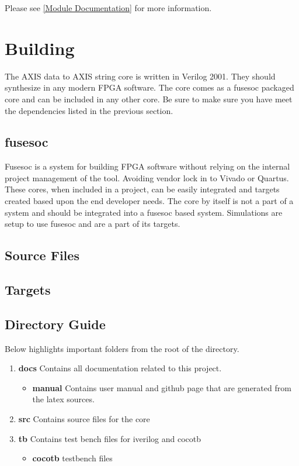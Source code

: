 Please see \ref{Module Documentation} for more information.

\section{Building}

\par
The AXIS data to AXIS string core is written in Verilog 2001. They should synthesize in any modern FPGA software. The core comes as a fusesoc packaged core and can be
included in any other core. Be sure to make sure you have meet the dependencies listed in the previous section.

\subsection{fusesoc}
\par
Fusesoc is a system for building FPGA software without relying on the internal project management of the tool. Avoiding vendor lock in to Vivado or Quartus.
These cores, when included in a project, can be easily integrated and targets created based upon the end developer needs. The core by itself is not a part of
a system and should be integrated into a fusesoc based system. Simulations are setup to use fusesoc and are a part of its targets.

\subsection{Source Files}



\subsection{Targets}



\subsection{Directory Guide}

\par
Below highlights important folders from the root of the directory.

\begin{enumerate}
  \item \textbf{docs} Contains all documentation related to this project.
    \begin{itemize}
      \item \textbf{manual} Contains user manual and github page that are generated from the latex sources.
    \end{itemize}
  \item \textbf{src} Contains source files for the core
  \item \textbf{tb} Contains test bench files for iverilog and cocotb
    \begin{itemize}
      \item \textbf{cocotb} testbench files
    \end{itemize}
\end{enumerate}

